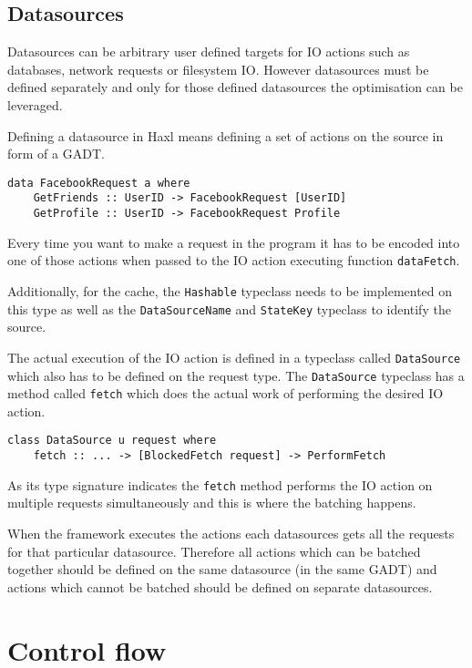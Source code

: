 \subsection{Datasources}

Datasources can be arbitrary user defined targets for IO actions such as databases, network requests or filesystem IO.
However datasources must be defined separately and only for those defined datasources the optimisation can be leveraged.

Defining a datasource in Haxl means defining a set of actions on the source in form of a GADT.

\begin{verbatim}
data FacebookRequest a where
    GetFriends :: UserID -> FacebookRequest [UserID]
    GetProfile :: UserID -> FacebookRequest Profile
\end{verbatim}

Every time you want to make a request in the program it has to be encoded into one of those actions when passed to the IO action executing function \texttt{dataFetch}.

Additionally, for the cache, the \texttt{Hashable} typeclass needs to be implemented on this type as well as the \texttt{DataSourceName} and \texttt{StateKey} typeclass to identify the source.

The actual execution of the IO action is defined in a typeclass called \texttt{DataSource} which also has to be defined on the request type.
The \texttt{DataSource} typeclass has a method called \texttt{fetch} which does the actual work of performing the desired IO action.

\begin{verbatim}
class DataSource u request where
    fetch :: ... -> [BlockedFetch request] -> PerformFetch
\end{verbatim}

As its type signature indicates the \texttt{fetch} method performs the IO action on multiple requests simultaneously and this is where the batching happens.

When the framework executes the actions each datasources gets all the requests for that particular datasource. Therefore all actions which can be batched together should be defined on the same datasource (in the same GADT) and actions which cannot be batched should be defined on separate datasources.

\section{Control flow}

